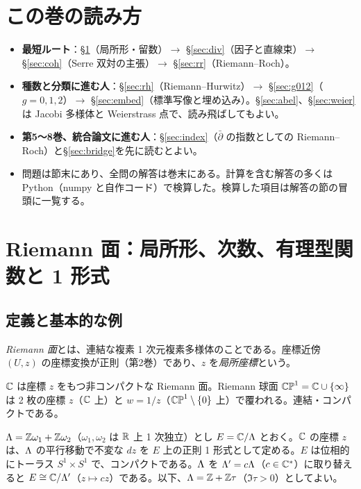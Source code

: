 \section*{この巻の読み方}
\begin{itemize}
\item \textbf{最短ルート}：\S\ref{sec:surf}（局所形・留数）$\to$ \S\ref{sec:div}（因子と直線束）$\to$ \S\ref{sec:coh}（Serre 双対の主張）$\to$ \S\ref{sec:rr}（Riemann--Roch）。
\item \textbf{種数と分類に進む人}：\S\ref{sec:rh}（Riemann--Hurwitz）$\to$ \S\ref{sec:g012}（$g=0,1,2$）$\to$ \S\ref{sec:embed}（標準写像と埋め込み）。\S\ref{sec:abel}、\S\ref{sec:weier} は Jacobi 多様体と Weierstrass 点で、読み飛ばしてもよい。
\item \textbf{第5〜8巻、統合論文に進む人}：\S\ref{sec:index}（$\bar\partial$ の指数としての Riemann--Roch）と\S\ref{sec:bridge}を先に読むとよい。
\item 問題は節末にあり、全問の解答は巻末にある。計算を含む解答の多くは Python（numpy と自作コード）で検算した。検算した項目は解答の節の冒頭に一覧する。
\end{itemize}

\section{Riemann 面：局所形、次数、有理型関数と 1 形式}\label{sec:surf}

\subsection{定義と基本的な例}
\begin{defn}[Riemann 面]
\emph{Riemann 面}とは、連結な複素 1 次元複素多様体のことである。座標近傍 $(U,z)$ の座標変換が正則（第2巻）であり、$z$ を\emph{局所座標}という。
\end{defn}

\begin{ex}[$\C$、$\CP^1$]
$\C$ は座標 $z$ をもつ非コンパクトな Riemann 面。Riemann 球面 $\mathbb{CP}^1=\mathbb C\cup\{\infty\}$ は 2 枚の座標 $z$（$\C$ 上）と $w=1/z$（$\mathbb{CP}^1\setminus\{0\}$ 上）で覆われる。連結・コンパクトである。
\end{ex}

\begin{ex}[複素トーラス（楕円曲線）$E=\C/\Lat$]\label{ex:torus}
$\Lambda=\mathbb Z\omega_1+\mathbb Z\omega_2$（$\omega_1,\omega_2$ は $\mathbb R$ 上 1 次独立）とし $E=\C/\Lat$ とおく。$\C$ の座標 $z$ は、$\Lambda$ の平行移動で不変な $dz$ を $E$ 上の正則 1 形式として定める。$E$ は位相的にトーラス $S^1\times S^1$ で、コンパクトである。$\Lambda$ を $\Lambda'=c\Lambda$（$c\in\mathbb C^*$）に取り替えると $E\cong\mathbb C/\Lambda'$（$z\mapsto cz$）である。以下、$\Lambda=\mathbb Z+\mathbb Z\tau$（$\Im\tau>0$）としてよい。
\end{ex}

